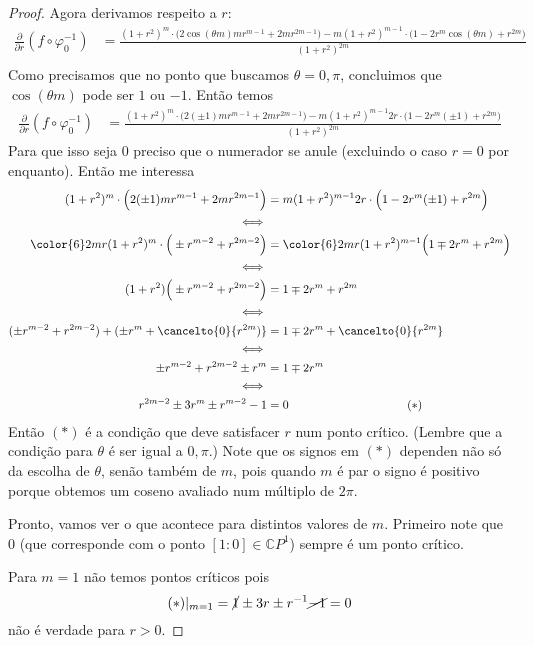 \begin{proof}
Agora derivamos respeito a \(r\):
\begin{align*}
\frac{\partial }{\partial r}(f \circ \varphi_0^{-1})&=\frac{(1+r^2)^m\cdot \Big(2\cos (\theta m)m r^{m-1}+2mr^{2m-1}\Big)-m(1+r^2)^{m-1}\cdot \Big(1-2r^m \cos (\theta m)+r^{2m}\Big)}{(1+r^2)^{2m}}\\
\end{align*}
Como precisamos que no ponto que buscamos \(\theta =0,\pi\), concluimos que \(\cos (\theta m)\) pode ser \(1\) ou \(-1\). Então temos
\begin{align*}
\frac{\partial }{\partial r}(f \circ \varphi_0^{-1})&=\frac{(1+r^2)^m\cdot \Big(2(\pm 1)m r^{m-1}+2mr^{2m-1}\Big)-m(1+r^2)^{m-1}2r\cdot \Big(1-2r^m (\pm 1)+r^{2m}\Big)}{(1+r^2)^{2m}}
\end{align*}
Para que isso seja \(0\) preciso que o numerador se anule (excluindo o caso \(r=0\) por enquanto). Então me interessa
\begin{align*}
(1+r^2)^m\cdot \Big(2(\pm 1)m r^{m-1}+2mr^{2m-1}\Big)&=m(1+r^2)^{m-1}2r\cdot \Big(1-2r^m (\pm 1)+r^{2m}\Big)\\
\iff\\
{\color{6}2mr}(1+r^2)^m\cdot \Big(\pm r^{m-2}+r^{2m-2}\Big)&={\color{6}2mr}(1+r^2)^{m-1}\Big(1\mp 2r^m+r^{2m}\Big)\\
\iff\\
(1+r^2)\Big(\pm r^{m-2}+r^{2m-2}\Big)&=1\mp 2r^m+r^{2m}\\
\iff\\
(\pm r^{m-2}+r^{2m-2})+(\pm r^{m}+\cancelto{0}{r^{2m})}&=1\mp 2r^m+\cancelto{0}{r^{2m}}\\\iff\\
\pm r^{m-2}+r^{2m-2}\pm r^{m}&=1\mp 2r^m\\
\iff \\
r^{2m-2}\pm 3r^m \pm r^{m-2}-1&=0 \qquad \qquad\qquad \qquad \qquad   (*)
\end{align*}
Então \((*)\) é a condição que deve satisfacer \(r\) num ponto crítico. (Lembre que a condição para \(\theta\) é ser igual a \(0,\pi\).) Note que os signos em \((*)\) dependen não só da escolha de \(\theta\), senão também de \(m\), pois quando \(m\) é par o signo é positivo porque obtemos um coseno avaliado num múltiplo de \(2\pi\).

Pronto, vamos ver o que acontece para distintos valores de \(m\). Primeiro note que  \(0\) (que corresponde com o ponto  \([1:0] \in \mathbb{C}P^1\)) sempre é um ponto crítico.

Para \(m=1\) não temos pontos críticos pois 
\[(*)|_{m=1}=\cancel{1} \pm 3r \pm  r^{-1}\cancel{-1}=0\]
não é verdade para \(r>0\).


\end{proof}
